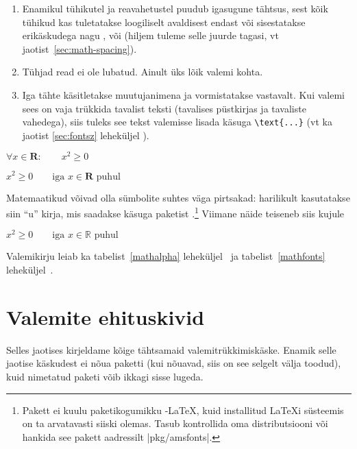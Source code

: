 \begin{enumerate}

\item {}Enamikul tühikutel ja
reavahetustel puudub igasugune tähtsus, sest kõik tühikud kas
tuletatakse loogiliselt avaldisest endast või sisestatakse erikäskudega
nagu \ci{,},  või  (hiljem tuleme selle juurde
tagasi, vt jaotist~\ref{sec:math-spacing}).

\item Tühjad read ei ole lubatud. Ainult üks lõik valemi kohta.

\item Iga tähte käsitletakse muutujanimena ja vormistatakse vastavalt.
Kui valemi sees on vaja trükkida tavalist teksti (tavalises püstkirjas
ja tavaliste vahedega), siis tuleks see tekst valemisse lisada käsuga
\verb|\text{...}| (vt ka jaotist \ref{sec:fontsz} leheküljel
\pageref{sec:fontsz}).

\end{enumerate}
\begin{example}
$\forall x \in \mathbf{R}:
 \qquad x^{2} \geq 0$
\end{example}
\begin{example}
$x^{2} \geq 0\qquad
 \text{iga }x\in\mathbf{R}
 \text{ puhul}$
\end{example}

Matemaatikud võivad olla sümbolite suhtes väga pirtsakad: harilikult
kasutatakse siin "`u"' kirja, mis
saadakse käsuga  paketist .\footnote{Pakett
 ei kuulu paketikogumikku
\AmS-\LaTeX{}, kuid installitud \LaTeX i
süsteemis on ta arvatavasti siiski olemas. Tasub kontrollida oma
distributsiooni või hankida see pakett aadressilt
\CTAN|pkg/amsfonts|.}
\ifx\mathbb\undefined\else Viimane näide teiseneb siis kujule
\begin{example}
$x^{2} \geq 0\qquad
 \text{iga } x
 \in \mathbb{R} \text{ puhul}$
\end{example}
\fi
Valemikirju leiab ka tabelist~\ref{mathalpha}
leheküljel~\pageref{mathalpha} ja tabelist~\ref{mathfonts}
leheküljel~\pageref{mathfonts}.

\section{Valemite ehituskivid}

Selles jaotises kirjeldame kõige tähtsamaid valemitrükkimiskäske. Enamik
selle jaotise käskudest ei nõua paketti  (kui nõuavad,
siis on see selgelt välja toodud), kuid nimetatud paketi võib ikkagi
sisse lugeda.

